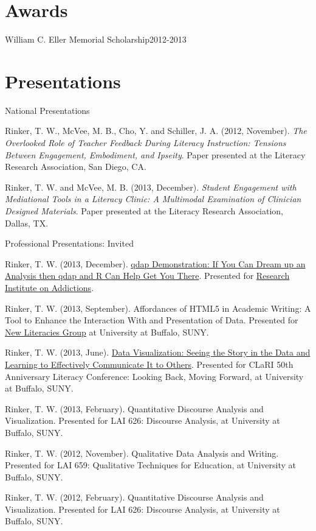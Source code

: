 \section{Awards}
\begin{innerlist}
    \item William C. Eller Memorial Scholarship\hfill 2012-2013
\end{innerlist}

\halfblankline

\section{Presentations}
National Presentations
\begin{innerlist}
\item Rinker, T. W., McVee, M. B., Cho, Y. and Schiller, J. A. (2012, November).  \emph{The Overlooked Role of Teacher Feedback During Literacy Instruction: Tensions Between Engagement, Embodiment, and Ipseity}.  Paper presented at the Literacy Research Association, San Diego, CA.

\item Rinker, T. W. and McVee, M. B. (2013, December).  \emph{Student Engagement with Mediational Tools in a Literacy Clinic: A Multimodal Examination of Clinician Designed Materials}.  Paper presented at the Literacy Research Association, Dallas, TX.
\end{innerlist}

\halfblankline

Professional Presentations: Invited
\begin{innerlist}
    \item Rinker, T. W. (2013, December). \href{http://rpubs.com/trinker/11429}{qdap Demonstration: If You Can Dream up an Analysis then qdap and R Can Help Get You There}.  Presented for \href{http://www.buffalo.edu/ria.html}{Research Institute on Addictions}.
    \item Rinker, T. W. (2013, September). Affordances of HTML5 in Academic Writing: A Tool to Enhance the Interaction With and Presentation of Data.  Presented for \href{http://gse.buffalo.edu/org/nlg/}{New Literacies Group} at University at Buffalo, SUNY.
    \item Rinker, T. W. (2013, June). \href{http://www.youtube.com/watch?v=IHHPO4VhucY}{Data Visualization: Seeing the Story in the Data and Learning to Effectively Communicate It to Others}.  Presented for CLaRI 50th Anniversary Literacy Conference: Looking Back, Moving Forward, at University at Buffalo, SUNY.
	\item Rinker, T. W. (2013, February). Quantitative Discourse Analysis and Visualization. Presented for LAI 626: Discourse Analysis, at University at Buffalo, SUNY.
	\item Rinker, T. W. (2012, November). Qualitative Data Analysis and Writing. Presented for LAI 659: Qualitative Techniques for Education, at University at Buffalo, SUNY.
	\item Rinker, T. W. (2012, February). Quantitative Discourse Analysis and Visualization. Presented for LAI 626: Discourse Analysis, at University at Buffalo, SUNY.
\end{innerlist}

